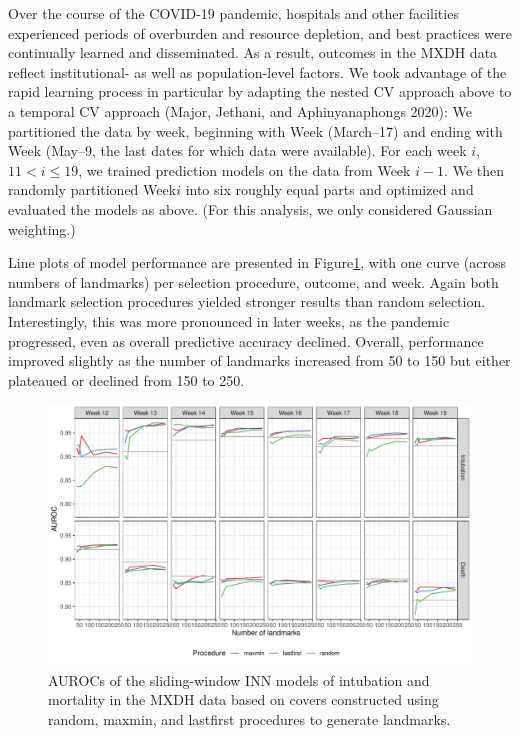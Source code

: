 \documentclass{article}
\begin{document}
Over the course of the COVID-19 pandemic, hospitals and other facilities
experienced periods of overburden and resource depletion, and best
practices were continually learned and disseminated. As a result,
outcomes in the MXDH data reflect institutional- as well as
population-level factors. We took advantage of the rapid learning
process in particular by adapting the nested CV approach above to a
temporal CV approach (Major, Jethani, and Aphinyanaphongs 2020): We
partitioned the data by week, beginning with Week
(March--17) and ending with Week (May--9, the last
dates for which data were available). For each week \(i\),
\(11 < i \leq 19\), we trained prediction models on the data from Week
\(i-1\). We then randomly partitioned Week\nbs\(i\) into six roughly
equal parts and optimized and evaluated the models as above. (For this
analysis, we only considered Gaussian weighting.)

Line plots of model performance are presented in
Figure\nbs\ref{fig:knn-mx}, with one curve (across numbers of landmarks)
per selection procedure, outcome, and week. Again both landmark
selection procedures yielded stronger results than random selection.
Interestingly, this was more pronounced in later weeks, as the pandemic
progressed, even as overall predictive accuracy declined. Overall,
performance improved slightly as the number of landmarks increased from
50 to 150 but either plateaued or declined from 150 to 250.

\begin{figure}
\includegraphics[width=\textwidth]{../figures/knn-auc-mx-gaussian}
\caption{
AUROCs of the sliding-window INN models of intubation and mortality in the MXDH data based on covers constructed using random, maxmin, and lastfirst procedures to generate landmarks.
\label{fig:knn-mx}
}
\end{figure}
\end{document}
